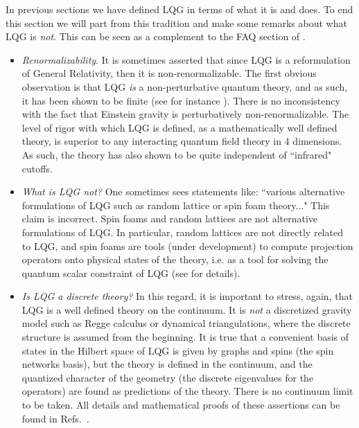 \documentclass[aps,prd,tightenlines,showpacs,nofootinbib,preprint]{revtex4}
\begin{document}
In previous sections we have defined LQG in terms of what it is
and does. To end this section we will part from this tradition and
make some remarks about what LQG is {\it not}. This can be seen as
a complement to the FAQ section of \cite{Smolin:2004sx}.

\begin{itemize}

\item {\it Renormalizability}.
 It is sometimes asserted that since LQG is a reformulation of
General Relativity, then it is non-renormalizable. The first
obvious observation is that LQG {\it is} a non-perturbative
quantum theory, and as such, it has been shown to be finite (see
for instance \cite{AL:review,Thiemann:2001yy}). There is no
inconsistency with the fact that Einstein gravity is
perturbatively non-renormalizable. The level of rigor with which
LQG is defined, as a mathematically well defined theory, is
superior to any interacting quantum field theory in 4 dimensions.
As such, the theory has also shown to be quite independent of
``infrared" cutoffs.

\item {\it What is LQG not?} One sometimes sees statements like:
``various alternative formulations of LQG such as random lattice
or spin foam theory..." This claim is incorrect. Spin foams and
random lattices are not alternative formulations of LQG. In
particular, random lattices are not directly related to LQG, and
spin foams are tools (under development) to compute projection
operators onto physical states of the theory, i.e. as a tool for
solving the quantum scalar constraint of LQG (see
\cite{Perez:2004hj} for details).

\item {\it Is LQG a discrete theory?} In this regard, it is
important to stress, again, that LQG is a well defined theory on
the continuum. It is {\it not} a discretized gravity model such as
Regge calculus or dynamical triangulations, where the discrete
structure is assumed from the beginning. It is true that a
convenient basis of states in the Hilbert space of LQG is given by
graphs and spins (the spin networks basis), but the theory is
defined in the continuum, and the quantized character of the
geometry (the discrete eigenvalues for the operators) are found as
predictions of the theory. There is no continuum limit to be
taken. All details and mathematical proofs of these assertions can
be found in Refs.~\cite{AL:review,Thiemann:2001yy}.

\end{itemize}
\end{document}
